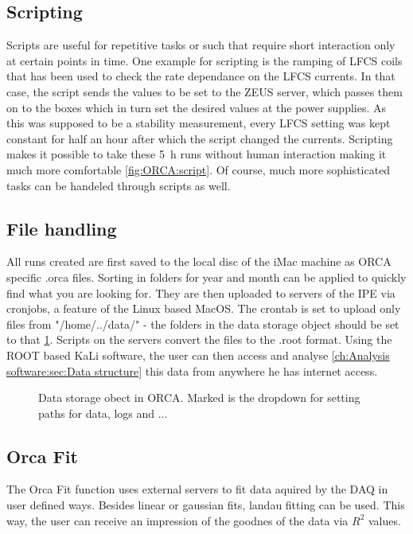     \subsection{Scripting}
    \label{ch:OrcaControl:sec:Scripting}
    Scripts are useful for repetitive tasks or such that require short interaction only at certain points in time. One example for scripting is the ramping of LFCS coils that has been used to check the rate dependance on the LFCS currents. In that case, the script sends the values to be set to the ZEUS server, which passes them on to the  boxes which in turn set the desired values at the power supplies. As this was supposed to be a stability measurement, every LFCS setting was kept constant for half an hour after which the script changed the currents. Scripting makes it possible to take these \SI{5}{\hour} runs without human interaction making it much more comfortable \ref{fig:ORCA:script}. Of course, much more sophisticated tasks can be handeled through scripts as well.
    
    \subsection{File handling}
    \label{ch:OrcaControl:sec:FileHandling}
    All runs created are first saved to the local disc of the iMac machine as ORCA specific .orca files. Sorting in folders for year and month can be applied to quickly find what you are looking for. They are then uploaded to servers of the IPE via cronjobs, a feature of the Linux based MacOS. The crontab is set to upload only files from "/home/../data/"  - the folders in the data storage object should be set to that \ref{fig:ORCA:dataStorage}. Scripts on the servers convert the files to the .root format. Using the ROOT based KaLi software, the user can then access and analyse \ref{ch:Analysis software:sec:Data structure} this data from anywhere he has internet access. 
    
    \begin{figure}
    	\caption{Data storage obect in ORCA. Marked is the dropdown for setting paths for data, logs and ...}
    	\label{fig:ORCA:dataStorage}
    \end{figure}

    
    \subsection{Orca Fit}
    \label{ch:OrcaControl:sec:OrcaFit}
    The Orca Fit function uses external servers to fit data aquired by the DAQ in user defined ways. Besides linear or gaussian fits, landau fitting can be used. This way, the user can receive an impression of the goodnes of the data via $R^2$ values.
  
